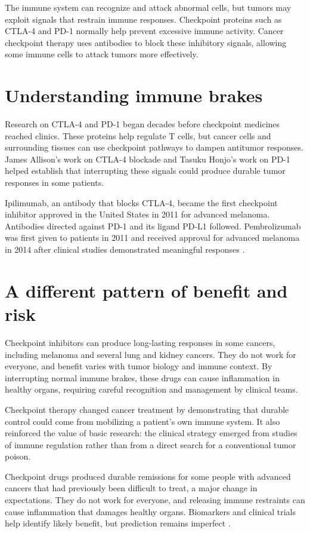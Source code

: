 \documentclass[12pt,oneside]{book}
\begin{document}
The immune system can recognize and attack abnormal cells, but tumors may
exploit signals that restrain immune responses. Checkpoint proteins such as
CTLA-4 and PD-1 normally help prevent excessive immune activity. Cancer
checkpoint therapy uses antibodies to block these inhibitory signals, allowing
some immune cells to attack tumors more effectively.

\section{Understanding immune brakes}
Research on CTLA-4 and PD-1 began decades before checkpoint medicines reached clinics. These proteins help regulate T cells, but cancer cells and surrounding tissues can use checkpoint pathways to dampen antitumor responses. James Allison's work on CTLA-4 blockade and Tasuku Honjo's work on PD-1 helped establish that interrupting these signals could produce durable tumor responses in some patients.

Ipilimumab, an antibody that blocks CTLA-4, became the first checkpoint
inhibitor approved in the United States in 2011 for advanced melanoma.
Antibodies directed against PD-1 and its ligand PD-L1 followed. Pembrolizumab
was first given to patients in 2011 and received approval for advanced
melanoma in 2014 after clinical studies demonstrated meaningful responses
\cite{nciCheckpointHistory,nciMelanomaTherapies}.

\section{A different pattern of benefit and risk}
Checkpoint inhibitors can produce long-lasting responses in some cancers, including melanoma and several lung and kidney cancers. They do not work for everyone, and benefit varies with tumor biology and immune context. By interrupting normal immune brakes, these drugs can cause inflammation in healthy organs, requiring careful recognition and management by clinical teams.

Checkpoint therapy changed cancer treatment by demonstrating that durable
control could come from mobilizing a patient's own immune system. It also
reinforced the value of basic research: the clinical strategy emerged from
studies of immune regulation rather than from a direct search for a
conventional tumor poison.

Checkpoint drugs produced durable remissions for some people with advanced
cancers that had previously been difficult to treat, a major change in
expectations. They do not work for everyone, and releasing immune restraints
can cause inflammation that damages healthy organs. Biomarkers and clinical
trials help identify likely benefit, but prediction remains imperfect
\cite{nciCheckpointHistory,nciMelanomaTherapies}.
\end{document}
